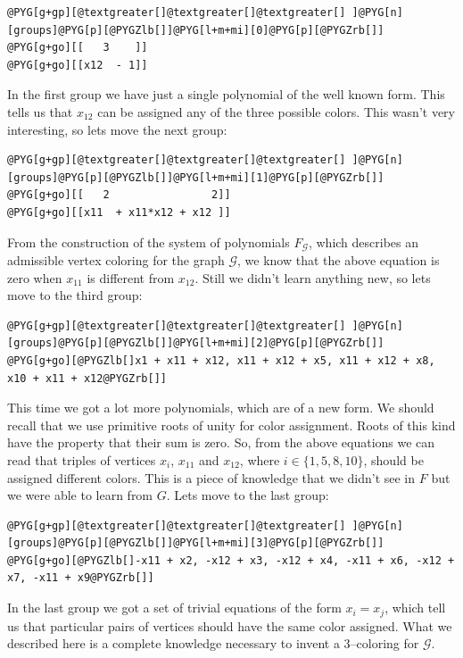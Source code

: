 \begin{Verbatim}[commandchars=@\[\]]
@PYG[g+gp][@textgreater[]@textgreater[]@textgreater[] ]@PYG[n][groups]@PYG[p][@PYGZlb[]]@PYG[l+m+mi][0]@PYG[p][@PYGZrb[]]
@PYG[g+go][[   3    ]]
@PYG[g+go][[x12  - 1]]
\end{Verbatim}
\noindent
In the first group we have just a single polynomial of the well known form. This tells us that $x_{12}$
can be assigned any of the three possible colors. This wasn't very interesting, so lets move the next
group:

\begin{Verbatim}[commandchars=@\[\]]
@PYG[g+gp][@textgreater[]@textgreater[]@textgreater[] ]@PYG[n][groups]@PYG[p][@PYGZlb[]]@PYG[l+m+mi][1]@PYG[p][@PYGZrb[]]
@PYG[g+go][[   2                2]]
@PYG[g+go][[x11  + x11*x12 + x12 ]]
\end{Verbatim}
\noindent
From the construction of the system of polynomials $F_{\mathcal{G}}$, which describes an admissible
vertex coloring for the graph $\mathcal{G}$, we know that the above equation is zero when $x_{11}$
is different from $x_{12}$. Still we didn't learn anything new, so lets move to the third group:

\begin{Verbatim}[commandchars=@\[\]]
@PYG[g+gp][@textgreater[]@textgreater[]@textgreater[] ]@PYG[n][groups]@PYG[p][@PYGZlb[]]@PYG[l+m+mi][2]@PYG[p][@PYGZrb[]]
@PYG[g+go][@PYGZlb[]x1 + x11 + x12, x11 + x12 + x5, x11 + x12 + x8, x10 + x11 + x12@PYGZrb[]]
\end{Verbatim}
\noindent
This time we got a lot more polynomials, which are of a new form. We should recall that we use
primitive roots of unity for color assignment. Roots of this kind have the property that their
sum is zero. So, from the above equations we can read that triples of vertices $x_i$, $x_{11}$
and $x_{12}$, where $i \in \{1, 5, 8, 10\}$, should be assigned different colors. This is a
piece of knowledge that we didn't see in $F$ but we were able to learn from $G$. Lets move
to the last group:

\begin{Verbatim}[commandchars=@\[\]]
@PYG[g+gp][@textgreater[]@textgreater[]@textgreater[] ]@PYG[n][groups]@PYG[p][@PYGZlb[]]@PYG[l+m+mi][3]@PYG[p][@PYGZrb[]]
@PYG[g+go][@PYGZlb[]-x11 + x2, -x12 + x3, -x12 + x4, -x11 + x6, -x12 + x7, -x11 + x9@PYGZrb[]]
\end{Verbatim}
\noindent
In the last group we got a set of trivial equations of the form $x_i = x_j$, which tell us that
particular pairs of vertices should have the same color assigned. What we described here is a
complete knowledge necessary to invent a $3$--coloring for $\mathcal{G}$.

